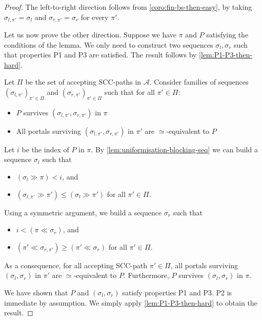\documentclass[letterpaper, USenglish, cleveref, autoref, thm-restate, numberwithinsect]{lipics-v2021}
\theoremstyle{theorem}
\theoremstyle{definition}
\newcommand{\Aa}{\mathcal{A}}
\newcommand{\equivportals}{\simeq}
\newcommand{\lefteffect}[2]{(#1 \gg #2)}
\newcommand{\righteffect}[2]{(#2 \ll #1)}
\newcommand{\SCCpath}{\pi}
\begin{document}
\begin{proof}
	The left-to-right direction follows from \cref{coro:fin-bs-then-easy}, by taking $\sigma_{l, \SCCpath'} = \sigma_l$ and $\sigma_{r, \SCCpath'} = \sigma_r$ for every $\SCCpath'$.

	Let us now prove the other direction.
	Suppose we have $\SCCpath$ and $P$ satisfying the conditions of the lemma.
	We only need to construct two sequences $\sigma_l, \sigma_r$ such that properties P1 and P3 are satisfied.
	The result follows by \cref{lem:P1-P3-then-hard}.
	
	Let $\Pi$ be the set of accepting SCC-paths in $\Aa$. 
	Consider families of sequences $(\sigma_{l, \SCCpath'})_{\SCCpath' \in \Pi}$ and $(\sigma_{r, \SCCpath'})_{\SCCpath' \in \Pi}$ such that for all $\SCCpath' \in \Pi$:
	\begin{itemize}
		\item $P$ survives $(\sigma_{l, \SCCpath'}, \sigma_{r, \SCCpath'})$ in $\SCCpath$
		\item All portals surviving $(\sigma_{l, \SCCpath'}, \sigma_{r, \SCCpath'})$ in $\SCCpath'$ are $\equivportals$-equivalent to $P$
	\end{itemize} 
	
	Let $i$ be the index of $P$ in $\SCCpath$.	
	By \cref{lem:uniformisation-blocking-seq} we can build a sequence $\sigma_l$ such that 
	\begin{itemize}
		\item $\lefteffect{\sigma_l}{\SCCpath} < i$, and
		\item $\lefteffect{\sigma_{l, \SCCpath'}}{\SCCpath'} \leq \lefteffect{\sigma_l}{\SCCpath'}$ for all $\SCCpath' \in \Pi$.
	\end{itemize}
	
	Using a symmetric argument, we build a sequence $\sigma_r$ such that 
	\begin{itemize}
		\item $i< \righteffect{\sigma_r}{\SCCpath}$, and
		\item $\righteffect{\sigma_{r, \SCCpath'}}{\SCCpath'} \geq \righteffect{\sigma_r}{\SCCpath'}$ for all $\SCCpath' \in \Pi$.
	\end{itemize}
	
	As a consequence, for all accepting SCC-path $\SCCpath' \in \Pi$, all portals surviving $(\sigma_l, \sigma_r)$ in $\SCCpath'$ are $\equivportals$-equivalent to $P$.
	Furthermore, $P$ survives $(\sigma_l, \sigma_r)$ in $\SCCpath$.
	
	We have shown that $P$ and $(\sigma_l, \sigma_r)$ satisfy properties P1 and P3. 
	P2 is immediate by assumption. 
	We simply apply \cref{lem:P1-P3-then-hard} to obtain the result.
\end{proof}
\end{document}
